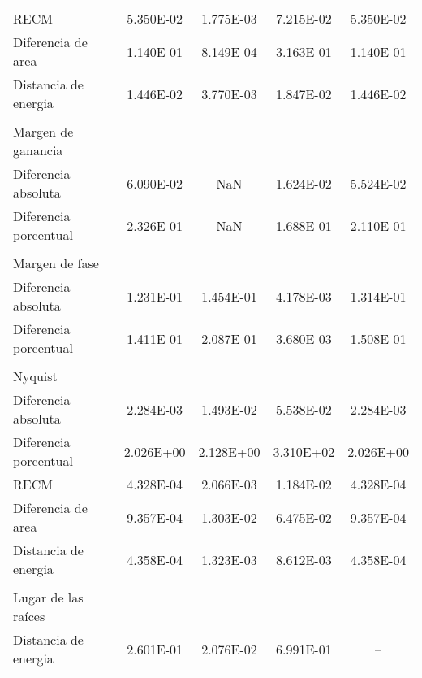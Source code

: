 {\begin{longtable}{l @{\extracolsep{\fill}} cccc}
            RECM                   & \num{5.350E-02} & \num{1.775E-03} & \num{7.215E-02} & \num{5.350E-02}  \\
            Diferencia de area     & \num{1.140E-01} & \num{8.149E-04} & \num{3.163E-01} & \num{1.140E-01}  \\
            Distancia de energia   & \num{1.446E-02} & \num{3.770E-03} & \num{1.847E-02} & \num{1.446E-02}  \\
            & & & & \\
            Margen de ganancia     & & & & \\ \cmidrule{1-1}
            Diferencia absoluta    & \num{6.090E-02} &        NaN      & \num{1.624E-02} & \num{5.524E-02}  \\
            Diferencia porcentual  & \num{2.326E-01} &        NaN      & \num{1.688E-01} & \num{2.110E-01}  \\
            & & & & \\
            Margen de fase         & & & & \\ \cmidrule{1-1}
            Diferencia absoluta    & \num{1.231E-01} & \num{1.454E-01} & \num{4.178E-03} & \num{1.314E-01}  \\
            Diferencia porcentual  & \num{1.411E-01} & \num{2.087E-01} & \num{3.680E-03} & \num{1.508E-01}  \\
            & & & & \\
            Nyquist                & & & & \\ \cmidrule{1-1}
            Diferencia absoluta    & \num{2.284E-03} & \num{1.493E-02} & \num{5.538E-02} & \num{2.284E-03}  \\
            Diferencia porcentual  & \num{2.026E+00} & \num{2.128E+00} & \num{3.310E+02} & \num{2.026E+00}  \\
            RECM                   & \num{4.328E-04} & \num{2.066E-03} & \num{1.184E-02} & \num{4.328E-04}  \\
            Diferencia de area     & \num{9.357E-04} & \num{1.303E-02} & \num{6.475E-02} & \num{9.357E-04}  \\
            Distancia de energia   & \num{4.358E-04} & \num{1.323E-03} & \num{8.612E-03} & \num{4.358E-04}  \\
            & & & & \\
            Lugar de las raíces    & & & & \\ \cmidrule{1-1}
            Distancia de energia   & \num{2.601E-01} & \num{2.076E-02} & \num{6.991E-01} &        --        \\

\end{longtable}}
